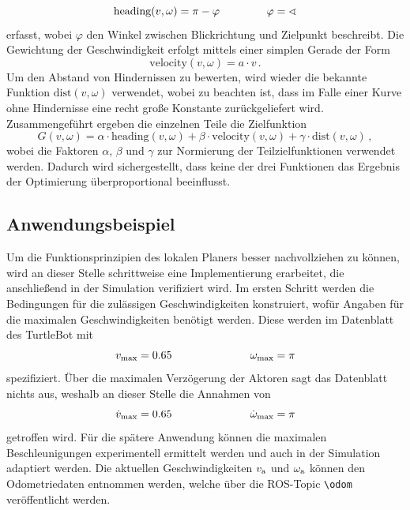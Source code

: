 \begin{equation}
\text{heading}(v, \omega) = \pi - \varphi \hspace{1.5cm} \varphi = \sphericalangle 
\end{equation}
erfasst, wobei $\varphi$ den Winkel zwischen Blickrichtung und Zielpunkt beschreibt. Die Gewichtung der Geschwindigkeit erfolgt mittels einer simplen Gerade der Form
\begin{equation}
\text{velocity}(v, \omega) = a\cdot v\,.
\end{equation}
Um den Abstand von Hindernissen zu bewerten, wird wieder die bekannte Funktion $\text{dist}(v,\omega)$ verwendet, wobei zu beachten ist, dass im Falle einer Kurve ohne Hindernisse eine recht große Konstante zurückgeliefert wird. Zusammengeführt ergeben die einzelnen Teile die Zielfunktion
\begin{equation}
G(v, \omega) = \alpha\cdot \text{heading}(v,\omega)+ \beta\cdot \text{velocity}(v,\omega)+\gamma\cdot \text{dist}(v,\omega)\,,
\end{equation}
wobei die Faktoren $\alpha$, $\beta$ und $\gamma$ zur Normierung der Teilzielfunktionen verwendet werden. Dadurch wird sichergestellt, dass keine der drei Funktionen das Ergebnis der Optimierung überproportional beeinflusst.

\subsection{Anwendungsbeispiel}
Um die Funktionsprinzipien des lokalen Planers besser nachvollziehen zu können, wird an dieser Stelle schrittweise eine Implementierung erarbeitet, die anschließend in der Simulation verifiziert wird. Im ersten Schritt werden die Bedingungen für die zulässigen Geschwindigkeiten konstruiert, wofür Angaben für die maximalen Geschwindigkeiten benötigt werden. Diese werden im Datenblatt des TurtleBot \cite{TurtlebotDS} mit
\begin{equation}
v_{\text{max}} = 0.65 \hspace{2.5cm} \omega_{\text{max}} = \pi
\end{equation}
spezifiziert. Über die maximalen Verzögerung der Aktoren sagt das Datenblatt nichts aus, weshalb an dieser Stelle die Annahmen von 
\begin{equation}
\dot{v}_{\text{max}} = 0.65 \hspace{2.5cm} \dot{\omega}_{\text{max}} =  \pi 
\end{equation}
getroffen wird. Für die spätere Anwendung können die maximalen Beschleunigungen experimentell ermittelt werden und auch in der Simulation adaptiert werden. Die aktuellen Geschwindigkeiten $v_{\text{a}}$ und $\omega_{\text{a}}$ können den Odometriedaten entnommen werden, welche über die ROS-Topic \lstinline{\odom}{} veröffentlicht werden. 


